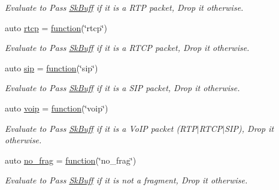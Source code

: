 \begin{DoxyCompactItemize}
\begin{DoxyCompactList}\small\item\em Evaluate to {\ttfamily Pass} \hyperlink{structpfq_1_1lang_1_1SkBuff}{Sk\+Buff} if it is a R\+TP packet, {\ttfamily Drop} it otherwise. \end{DoxyCompactList}\item 
auto \hyperlink{namespacepfq_1_1lang_1_1anonymous__namespace_02default_8hpp_03_ad16ac0dfb9ae7abc1db76ab8041bada3}{rtcp} = \hyperlink{namespacepfq_1_1lang_a1a4638059d700ae08d0ca63886ff2bb3}{function}(\char`\"{}rtcp\char`\"{})
\begin{DoxyCompactList}\small\item\em Evaluate to {\ttfamily Pass} \hyperlink{structpfq_1_1lang_1_1SkBuff}{Sk\+Buff} if it is a R\+T\+CP packet, {\ttfamily Drop} it otherwise. \end{DoxyCompactList}\item 
auto \hyperlink{namespacepfq_1_1lang_1_1anonymous__namespace_02default_8hpp_03_a3ac0338626e771b43b200663e095aa36}{sip} = \hyperlink{namespacepfq_1_1lang_a1a4638059d700ae08d0ca63886ff2bb3}{function}(\char`\"{}sip\char`\"{})
\begin{DoxyCompactList}\small\item\em Evaluate to {\ttfamily Pass} \hyperlink{structpfq_1_1lang_1_1SkBuff}{Sk\+Buff} if it is a S\+IP packet, {\ttfamily Drop} it otherwise. \end{DoxyCompactList}\item 
auto \hyperlink{namespacepfq_1_1lang_1_1anonymous__namespace_02default_8hpp_03_a814df3093ef905eedf9a9add4c625147}{voip} = \hyperlink{namespacepfq_1_1lang_a1a4638059d700ae08d0ca63886ff2bb3}{function}(\char`\"{}voip\char`\"{})
\begin{DoxyCompactList}\small\item\em Evaluate to {\ttfamily Pass} \hyperlink{structpfq_1_1lang_1_1SkBuff}{Sk\+Buff} if it is a Vo\+IP packet (R\+T\+P$\vert$\+R\+T\+C\+P$\vert$\+S\+IP), {\ttfamily Drop} it otherwise. \end{DoxyCompactList}\item 
auto \hyperlink{namespacepfq_1_1lang_1_1anonymous__namespace_02default_8hpp_03_a4cfaf018f687a1563161b8f4245a6652}{no\+\_\+frag} = \hyperlink{namespacepfq_1_1lang_a1a4638059d700ae08d0ca63886ff2bb3}{function}(\char`\"{}no\+\_\+frag\char`\"{})
\begin{DoxyCompactList}\small\item\em Evaluate to {\ttfamily Pass} \hyperlink{structpfq_1_1lang_1_1SkBuff}{Sk\+Buff} if it is not a fragment, {\ttfamily Drop} it otherwise. \end{DoxyCompactList}\item 

\end{DoxyCompactItemize}
